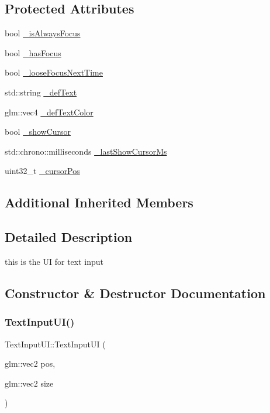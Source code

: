 \subsection*{Protected Attributes}
\begin{DoxyCompactItemize}
\item 
bool \hyperlink{class_text_input_u_i_af83c8b47cf12c212961170eaa3ffffc1}{\+\_\+is\+Always\+Focus}
\item 
bool \hyperlink{class_text_input_u_i_a5cab7b43ee7e9c6a200da88cead92d25}{\+\_\+has\+Focus}
\item 
bool \hyperlink{class_text_input_u_i_ae915ceda6857bcae90f1d065d99743fe}{\+\_\+loose\+Focus\+Next\+Time}
\item 
std\+::string \hyperlink{class_text_input_u_i_afe90275d15804770ddca5a77caf0dc49}{\+\_\+def\+Text}
\item 
glm\+::vec4 \hyperlink{class_text_input_u_i_a0be1feabb67078fe74a2adfa7076ee30}{\+\_\+def\+Text\+Color}
\item 
bool \hyperlink{class_text_input_u_i_a30be39fd592784bf1e5d044215ec9a76}{\+\_\+show\+Cursor}
\item 
std\+::chrono\+::milliseconds \hyperlink{class_text_input_u_i_a5d41f55ca586107f43a2b45137076ce1}{\+\_\+last\+Show\+Cursor\+Ms}
\item 
uint32\+\_\+t \hyperlink{class_text_input_u_i_a06b223f0059aafca03f51dbe516f7fc7}{\+\_\+cursor\+Pos}
\end{DoxyCompactItemize}
\subsection*{Additional Inherited Members}


\subsection{Detailed Description}
this is the UI for text input 

\subsection{Constructor \& Destructor Documentation}
\mbox{\label{class_text_input_u_i_a502842551f51b722c7eb437d591b98f1}} 
\subsubsection{\texorpdfstring{Text\+Input\+U\+I()}{TextInputUI()}\hspace{0.1cm}{\footnotesize\ttfamily [1/2]}}
{\footnotesize\ttfamily Text\+Input\+U\+I\+::\+Text\+Input\+UI (\begin{DoxyParamCaption}\item[{glm\+::vec2}]{pos,  }\item[{glm\+::vec2}]{size }\end{DoxyParamCaption})}



